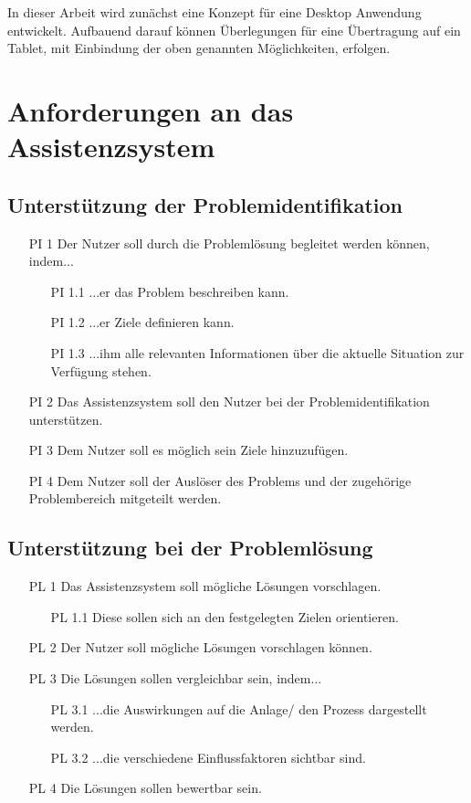 In dieser Arbeit wird zunächst eine Konzept für eine Desktop Anwendung entwickelt. Aufbauend darauf können Überlegungen für eine Übertragung auf ein Tablet, mit Einbindung der oben genannten Möglichkeiten, erfolgen.

\section{Anforderungen an das Assistenzsystem}
\label{3:Anforderungen}

\subsection*{Unterstützung der Problemidentifikation}
\begin{itemize}
\item[PI 1] Der Nutzer soll durch die Problemlösung begleitet werden können, indem...
	\begin{itemize}
	\item[PI 1.1] ...er das Problem beschreiben kann.
	\item [PI 1.2] ...er Ziele definieren kann.
	\item[PI 1.3] ...ihm alle relevanten Informationen über die aktuelle Situation zur Verfügung stehen.
	\end{itemize}
\item[PI 2] Das Assistenzsystem soll den Nutzer bei der Problemidentifikation unterstützen.
\item[PI 3] Dem Nutzer soll es möglich sein Ziele hinzuzufügen.
\item[PI 4] Dem Nutzer soll der Auslöser des Problems und der zugehörige Problembereich mitgeteilt werden.
\end{itemize}

\subsection*{Unterstützung bei der Problemlösung}
\begin{itemize}
\item[PL 1] Das Assistenzsystem soll mögliche Lösungen vorschlagen.
	\begin{itemize}
	\item[PL 1.1] Diese sollen sich an den festgelegten Zielen orientieren.
	\end{itemize}
\item[PL 2] Der Nutzer soll mögliche Lösungen vorschlagen können.
\item[PL 3] Die Lösungen sollen vergleichbar sein, indem...
	\begin{itemize}
	\item[PL 3.1] ...die Auswirkungen auf die Anlage/ den Prozess dargestellt werden.
	\item[PL 3.2] ...die verschiedene Einflussfaktoren sichtbar sind.
	\end{itemize}
\item[PL 4] Die Lösungen sollen bewertbar sein.
\end{itemize}

